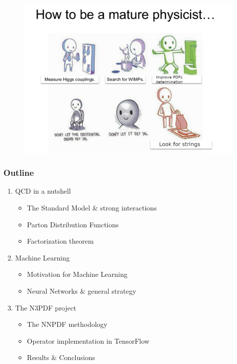 \documentclass[aspectratio=43]{beamer}
\begin{document}
\begin{frame}

	\begin{figure}
		\includegraphics[width = \linewidth]{joke3.png}
	\end{figure}

\end{frame}

\begin{frame}

	\frametitle{Outline}
	
	\begin{enumerate}
		\item {\color{blue}QCD in a nutshell}
		\begin{itemize}
			\item The Standard Model $\&$ strong interactions
			\item Parton Distribution Functions
			\item Factorization theorem
		\end{itemize}
		\item {\color{blue}Machine Learning}
		\begin{itemize}
			\item Motivation for Machine Learning
			\item Neural Networks $\&$ general strategy
		\end{itemize}
		\item {\color{blue}The N3PDF project}
		\begin{itemize}
			\item The NNPDF methodology
			\item Operator implementation in TensorFlow
			\item Results $\&$ Conclusions
		\end{itemize}
	\end{enumerate}
	
\end{frame}
\end{document}
